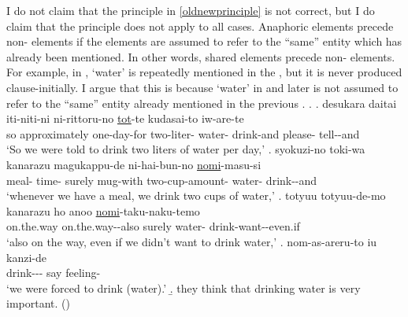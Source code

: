 I do not claim that the principle in \ref{oldnewprinciple} is not correct,
but I do claim that the principle does not apply to all cases.
Anaphoric elements precede non- elements
if the  elements are assumed to refer to the ``same'' entity which has already been mentioned.
In other words,
shared elements precede non- elements.
For example, in \Next,
 `water' is repeatedly mentioned in the ,
but it is never produced clause-initially.
I argue that this is because
 `water' in \Next[b] and later is not assumed to refer to the ``same'' entity already mentioned in the previous .
\largerpage
%
\ex.\label{WO:ClauseInit:Given:mizu}
 \ag. desukara daitai iti-niti-ni ni-rittoru-no  \ul{tot}-te kudasai-to iw-are-te \\
 so approximately one-day-for two-liter- water- drink-and please- tell--and \\
 `So we were told to drink two liters of water per day,'
 \bg. syokuzi-no toki-wa kanarazu magukappu-de ni-hai-bun-no  \ul{nomi}-masu-si \\
 	meal- time- surely mug-with two-cup-amount- water- drink--and \\
	`whenever we have a meal, we drink two cups of water,'
 \bg. totyuu totyuu-de-mo kanarazu  ho anoo \ul{nomi}-taku-naku-temo \\
 		on.the.way on.the.way--also surely water-   drink-want--even.if \\
		`also on the way, even if we didn't want to drink water,'
 \bg. nom-as-areru-to iu kanzi-de \\
 	drink--- say feeling- \\
	`we were forced to drink (water).'
 \b. they think that drinking water is very important.
  \hfill{()}


